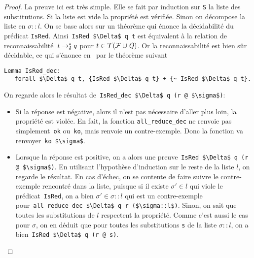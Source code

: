 \begin{proof}
  La preuve ici est très simple. Elle se fait par induction sur \lstinline!S! la liste des substitutions. 
  Si la liste est vide la propriété est vérifiée. Sinon on décompose la liste en $\sigma::l$.
  On se base alors sur un théorème qui énonce la décidabilité du prédicat \lstinline!IsRed!.
  Ainsi~\lstinline!IsRed $\Delta$ q t! est équivalent à la relation de reconnaissabilité~$t \rightarrow^*_\delta q$
  pour $t \in \mathcal{ T(F \cup \mathit Q)}$. Or la reconnaissabilité est bien sûr décidable, ce qui s'énonce en \coq\ par le théorème suivant

  \begin{lstlisting}
Lemma IsRed_dec:
   forall $\Delta$ q t, {IsRed $\Delta$ q t} + {~ IsRed $\Delta$ q t}.
 \end{lstlisting}

 On regarde alors le résultat de~\lstinline!IsRed_dec $\Delta$ q (r @ $\sigma$)!:
 \begin{itemize}
 \item Si la réponse est négative, alors il n'est pas nécessaire d'aller plus loin, la propriété est violée.
   En fait, la fonction \lstinline!all_reduce_dec! ne renvoie pas simplement~\lstinline!ok! ou~\lstinline!ko!,
   mais renvoie un contre-exemple. Donc la fonction va renvoyer~\lstinline!ko $\sigma$!. 
 \item Lorsque la réponse est positive, on a alors une preuve~\lstinline!IsRed $\Delta$ q (r @ $\sigma$)!.
   En utilisant l'hypothèse d'induction sur le reste de la liste $l$, on regarde le résultat. 
   En cas d'échec, on se contente de faire suivre le contre-exemple rencontré dans la liste, puisque si 
   il existe $\sigma' \in l$ qui viole le prédicat~\lstinline!IsRed!, on a bien $\sigma' \in \sigma::l$
   qui est un contre-exemple pour~\lstinline!all_reduce_dec $\Delta$ q r ($\sigma::l$)!.
   Sinon, on sait que toutes les substitutions de $l$ respectent la propriété. Comme c'est aussi le cas
   pour $\sigma$, on en déduit que pour toutes les substitutions \lstinline!s! de la liste  $\sigma::l$, 
   on a bien~\lstinline!IsRed $\Delta$ q (r @ s)!.
 \end{itemize}
\end{proof}

